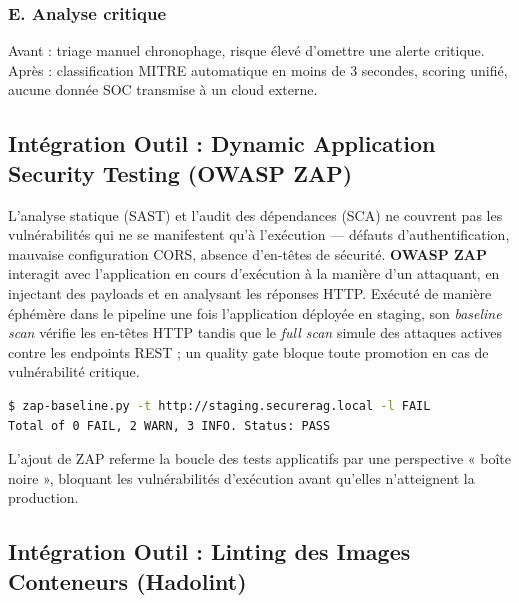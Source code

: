 \subsubsection{E. Analyse critique}
Avant : triage manuel chronophage, risque élevé d'omettre une alerte critique. Après : classification MITRE automatique en moins de 3 secondes, scoring unifié, aucune donnée SOC transmise à un cloud externe.



\subsection{Intégration Outil : Dynamic Application Security Testing (OWASP ZAP)}

L'analyse statique (SAST) et l'audit des dépendances (SCA) ne couvrent pas les vulnérabilités qui ne se manifestent qu'à l'exécution — défauts d'authentification, mauvaise configuration CORS, absence d'en-têtes de sécurité. \textbf{OWASP ZAP} interagit avec l'application en cours d'exécution à la manière d'un attaquant, en injectant des payloads et en analysant les réponses HTTP. Exécuté de manière éphémère dans le pipeline une fois l'application déployée en staging, son \textit{baseline scan} vérifie les en-têtes HTTP tandis que le \textit{full scan} simule des attaques actives contre les endpoints REST ; un quality gate bloque toute promotion en cas de vulnérabilité critique.

\begin{lstlisting}[language=bash, caption={Exécution du scan ZAP Baseline dans le pipeline CI}, label={lst:zap_proof}]
$ zap-baseline.py -t http://staging.securerag.local -l FAIL
Total of 0 FAIL, 2 WARN, 3 INFO. Status: PASS
\end{lstlisting}

L'ajout de ZAP referme la boucle des tests applicatifs par une perspective « boîte noire », bloquant les vulnérabilités d'exécution avant qu'elles n'atteignent la production.

\subsection{Intégration Outil : Linting des Images Conteneurs (Hadolint)}

